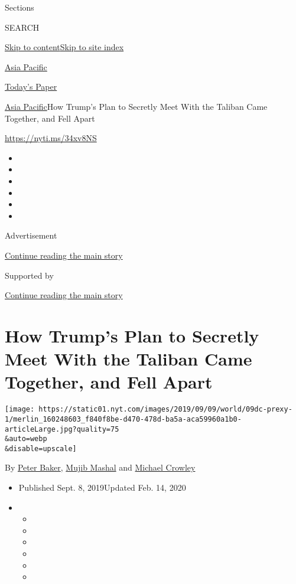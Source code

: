 Sections

SEARCH

\protect\hyperlink{site-content}{Skip to
content}\protect\hyperlink{site-index}{Skip to site index}

\href{https://www.nytimes.com/section/world/asia}{Asia Pacific}

\href{https://myaccount.nytimes.com/auth/login?response_type=cookie\&client_id=vi}{}

\href{https://www.nytimes.com/section/todayspaper}{Today's Paper}

\href{/section/world/asia}{Asia Pacific}\textbar{}How Trump's Plan to
Secretly Meet With the Taliban Came Together, and Fell Apart

\url{https://nyti.ms/34xv8NS}

\begin{itemize}
\item
\item
\item
\item
\item
\item
\end{itemize}

Advertisement

\protect\hyperlink{after-top}{Continue reading the main story}

Supported by

\protect\hyperlink{after-sponsor}{Continue reading the main story}

\hypertarget{how-trumps-plan-to-secretly-meet-with-the-taliban-came-together-and-fell-apart}{%
\section{How Trump's Plan to Secretly Meet With the Taliban Came
Together, and Fell
Apart}\label{how-trumps-plan-to-secretly-meet-with-the-taliban-came-together-and-fell-apart}}

\texttt{[image: https://static01.nyt.com/images/2019/09/09/world/09dc-prexy-1/merlin\_160248603\_f840f8be-d470-478d-ba5a-aca59960a1b0-articleLarge.jpg?quality=75\\\&auto=webp\\\&disable=upscale]}

By \href{https://www.nytimes.com/by/peter-baker}{Peter Baker},
\href{https://www.nytimes.com/by/mujib-mashal}{Mujib Mashal} and
\href{https://www.nytimes.com/by/michael-crowley}{Michael Crowley}

\begin{itemize}
\item
  Published Sept. 8, 2019Updated Feb. 14, 2020
\item
  \begin{itemize}
  \item
  \item
  \item
  \item
  \item
  \item
  \end{itemize}
\end{itemize}

